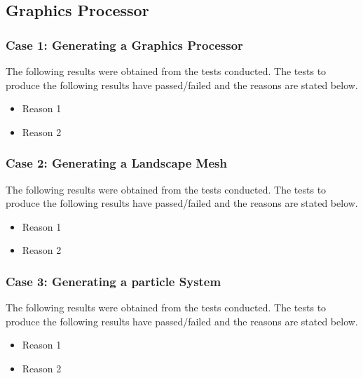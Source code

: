 \documentclass[11pt]{article}
\begin{document}
\subsection{Graphics Processor}
\subsubsection{Case 1: Generating a Graphics Processor}
The following results were obtained from the tests conducted. The tests to produce the
following results have passed/failed and the reasons are stated below.

\begin{itemize}
	\item Reason 1
	\item Reason 2
\end{itemize}

\subsubsection{Case 2: Generating a Landscape Mesh}
The following results were obtained from the tests conducted. The tests to produce the
following results have passed/failed and the reasons are stated below.

\begin{itemize}
	\item Reason 1
	\item Reason 2
\end{itemize}

\subsubsection{Case 3: Generating a particle System}
The following results were obtained from the tests conducted. The tests to produce the
following results have passed/failed and the reasons are stated below.

\begin{itemize}
	\item Reason 1
	\item Reason 2
\end{itemize}
\end{document}
